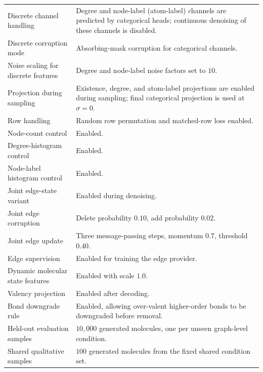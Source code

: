 \begin{xltabular}{\textwidth}{@{}p{0.34\textwidth}X@{}}
Discrete channel handling &
Degree and node-label (atom-label) channels are predicted by categorical heads;
continuous denoising of these channels is disabled. \\

Discrete corruption mode &
Absorbing-mask corruption for categorical channels. \\

Noise scaling for discrete features &
Degree and node-label noise factors set to \(10\). \\

Projection during sampling &
Existence, degree, and atom-label projections are enabled during sampling;
final categorical projection is used at \(\sigma=0\). \\

Row handling &
Random row permutation and matched-row loss enabled. \\

Node-count control &
Enabled. \\

Degree-histogram control &
Enabled. \\

Node-label histogram control &
Enabled. \\

Joint edge-state variant &
Enabled during denoising. \\

Joint edge corruption &
Delete probability \(0.10\), add probability \(0.02\). \\

Joint edge update &
Three message-passing steps, momentum \(0.7\), threshold \(0.40\). \\

Edge supervision &
Enabled for training the edge provider. \\

Dynamic molecular state features &
Enabled with scale \(1.0\). \\

Valency projection &
Enabled after decoding. \\

Bond downgrade rule &
Enabled, allowing over-valent higher-order bonds to be downgraded before
removal. \\

Held-out evaluation samples &
\(10{,}000\) generated molecules, one per unseen graph-level condition. \\

Shared qualitative samples &
\(100\) generated molecules from the fixed shared condition set. \\

\end{xltabular}
